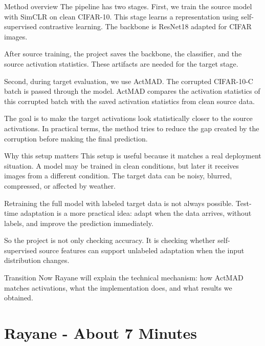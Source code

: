 \documentclass[11pt,a4paper]{article}
\begin{document}
\begin{sorooshbox}{Method overview}
The pipeline has two stages. First, we train the source model with SimCLR on clean CIFAR-10. This stage learns a representation using self-supervised contrastive learning. The backbone is ResNet18 adapted for CIFAR images.

After source training, the project saves the backbone, the classifier, and the source activation statistics. These artifacts are needed for the target stage.

Second, during target evaluation, we use ActMAD. The corrupted CIFAR-10-C batch is passed through the model. ActMAD compares the activation statistics of this corrupted batch with the saved activation statistics from clean source data.

The goal is to make the target activations look statistically closer to the source activations. In practical terms, the method tries to reduce the gap created by the corruption before making the final prediction.
\end{sorooshbox}

\begin{sorooshbox}{Why this setup matters}
This setup is useful because it matches a real deployment situation. A model may be trained in clean conditions, but later it receives images from a different condition. The target data can be noisy, blurred, compressed, or affected by weather.

Retraining the full model with labeled target data is not always possible. Test-time adaptation is a more practical idea: adapt when the data arrives, without labels, and improve the prediction immediately.

So the project is not only checking accuracy. It is checking whether self-supervised source features can support unlabeled adaptation when the input distribution changes.
\end{sorooshbox}

\begin{sorooshbox}{Transition}
Now Rayane will explain the technical mechanism: how ActMAD matches activations, what the implementation does, and what results we obtained.
\end{sorooshbox}

\section{Rayane - About 7 Minutes}
\end{document}
